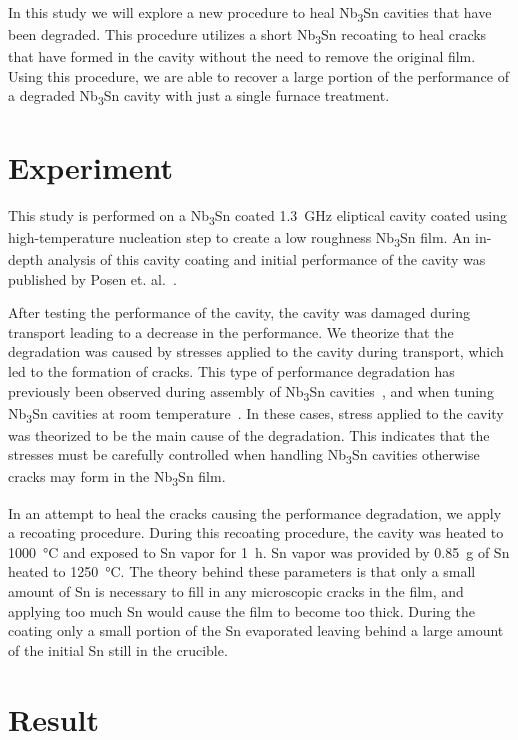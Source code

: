 \documentclass{revtex4-2}
\begin{document}
In this study we will explore a new procedure to heal Nb\textsubscript{3}Sn cavities that have been degraded. This procedure utilizes a short Nb\textsubscript{3}Sn recoating to heal cracks that have formed in the cavity without the need to remove the original film. Using this procedure, we are able to recover a large portion of the performance of a degraded Nb\textsubscript{3}Sn cavity with just a single furnace treatment.


\section{Experiment}
\label{sec:Experiment}

This study is performed on a Nb\textsubscript{3}Sn coated \qty{1.3}{\giga\hertz} eliptical cavity coated using high-temperature nucleation step to create a low roughness Nb\textsubscript{3}Sn film. An in-depth analysis of this cavity coating and initial performance of the cavity was published by Posen et. al.~\cite{posen2021advances}. 

After testing the performance of the cavity, the cavity was damaged during transport leading to a decrease in the performance. We theorize that the degradation was caused by stresses applied to the cavity during transport, which led to the formation of cracks. This type of performance degradation has previously been observed during assembly of Nb\textsubscript{3}Sn cavities~\cite{eremeev2023preservation}, and when tuning Nb\textsubscript{3}Sn cavities at room temperature~\cite{eremeev:srf2019-mop015}. In these cases, stress applied to the cavity was theorized to be the main cause of the degradation. This indicates that the stresses must be carefully controlled when handling Nb\textsubscript{3}Sn cavities otherwise cracks may form in the Nb\textsubscript{3}Sn film.

In an attempt to heal the cracks causing the performance degradation, we apply a recoating procedure. During this recoating procedure, the cavity was heated to \qty{1000}{\degreeCelsius} and exposed to Sn vapor for \qty{1}{\hour}. Sn vapor was provided by \qty{0.85}{\gram} of Sn heated to \qty{1250}{\degreeCelsius}. The theory behind these parameters is that only a small amount of Sn is necessary to fill in any microscopic cracks in the film, and applying too much Sn would cause the film to become too thick. During the coating only a small portion of the Sn evaporated leaving behind a large amount of the initial Sn still in the crucible. 

\section{Result}
\label{sec:Results}
\end{document}
